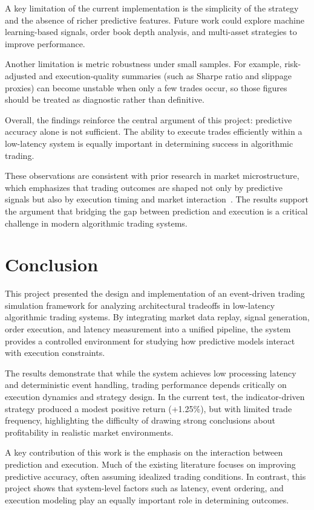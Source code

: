 \documentclass[12pt]{article}
\begin{document}
A key limitation of the current implementation is the simplicity of the 
strategy and the absence of richer predictive features. Future work could 
explore machine learning-based signals, order book depth analysis, and 
multi-asset strategies to improve performance.

Another limitation is metric robustness under small samples. For example, 
risk-adjusted and execution-quality summaries (such as Sharpe ratio and 
slippage proxies) can become unstable when only a few trades occur, so those 
figures should be treated as diagnostic rather than definitive.

Overall, the findings reinforce the central argument of this project: 
predictive accuracy alone is not sufficient. The ability to execute trades 
efficiently within a low-latency system is equally important in determining 
success in algorithmic trading.

These observations are consistent with prior research in market 
microstructure, which emphasizes that trading outcomes are shaped not 
only by predictive signals but also by execution timing and market 
interaction~\cite{bouchaudTrades, carteaMicrostructure}. The results 
support the argument that bridging the gap between prediction and 
execution is a critical challenge in modern algorithmic trading systems.

\section{Conclusion}
This project presented the design and implementation of an event-driven 
trading simulation framework for analyzing architectural tradeoffs in 
low-latency algorithmic trading systems. By integrating market data replay, 
signal generation, order execution, and latency measurement into a unified 
pipeline, the system provides a controlled environment for studying how 
predictive models interact with execution constraints.

The results demonstrate that while the system achieves low processing 
latency and deterministic event handling, trading performance depends 
critically on execution dynamics and strategy design. In the current test, 
the indicator-driven strategy produced a modest positive return (+1.25\%), 
but with limited trade frequency, highlighting the difficulty of drawing 
strong conclusions about profitability in realistic market environments.

A key contribution of this work is the emphasis on the interaction between 
prediction and execution. Much of the existing literature focuses on improving 
predictive accuracy, often assuming idealized trading conditions. In contrast, 
this project shows that system-level factors such as latency, event ordering, 
and execution modeling play an equally important role in determining outcomes.
\end{document}
